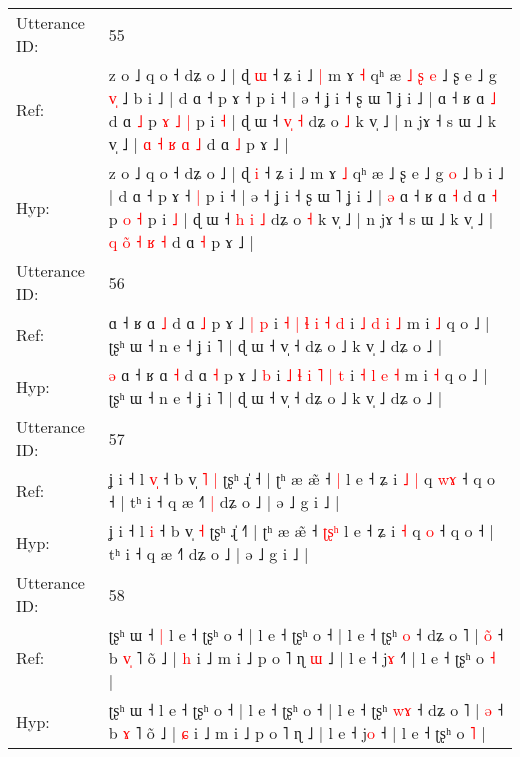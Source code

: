 \documentclass[10pt]{article}
\DeclareRobustCommand{\hl}[1]{{\textcolor{red}{#1}}}
\begin{document}
\begin{longtable}{ll}
 \\
\midrule
Utterance ID: & 55 \\
Ref: & z o ˩ q o ˧ dʑ o ˩ | ɖ \hl{ɯ} ˧ ʑ i ˩\hl{ }\hl{|} m ɤ \hl{˧} qʰ æ\hl{ }\hl{˩}\hl{ }\hl{ʂ}\hl{ }\hl{e} ˩ ʂ e ˩ g \hl{v}\hl{̩} ˩ b i ˩ | d ɑ ˧ p ɤ ˧\hl{}\hl{} p i ˧ | ə ˧ ʝ i ˧ ʂ ɯ ˥ ʝ i ˩ |\hl{}\hl{} ɑ ˧ ʁ ɑ \hl{˩} d ɑ \hl{˩} p\hl{ }\hl{ɤ} \hl{˩} \hl{|} p i \hl{˧} | ɖ ɯ ˧ \hl{}\hl{v}\hl{̩} \hl{˧} dʑ o \hl{˩} k v̩ ˩ | n jɤ ˧ s ɯ ˩ k v̩ ˩ | \hl{ɑ} \hl{}\hl{˧} \hl{ʁ} \hl{ɑ} \hl{˩} d ɑ \hl{˩} p ɤ ˩ |
 \\
Hyp: & z o ˩ q o ˧ dʑ o ˩ | ɖ \hl{i} ˧ ʑ i ˩\hl{}\hl{} m ɤ \hl{˩} qʰ æ\hl{}\hl{}\hl{}\hl{}\hl{}\hl{} ˩ ʂ e ˩ g \hl{}\hl{o} ˩ b i ˩ | d ɑ ˧ p ɤ ˧\hl{ }\hl{|} p i ˧ | ə ˧ ʝ i ˧ ʂ ɯ ˥ ʝ i ˩ |\hl{ }\hl{ə} ɑ ˧ ʁ ɑ \hl{˧} d ɑ \hl{˧} p\hl{}\hl{} \hl{o} \hl{˧} p i \hl{˩} | ɖ ɯ ˧ \hl{h}\hl{ }\hl{i} \hl{˩} dʑ o \hl{˧} k v̩ ˩ | n jɤ ˧ s ɯ ˩ k v̩ ˩ | \hl{q} \hl{o}\hl{̃} \hl{˧} \hl{ʁ} \hl{˧} d ɑ \hl{˧} p ɤ ˩ |
 \\
\midrule
Utterance ID: & 56 \\
Ref: & \hl{}\hl{}ɑ ˧ ʁ ɑ \hl{˩} d ɑ \hl{˩} p ɤ ˩\hl{ }\hl{|} \hl{p} i \hl{˧} \hl{|} \hl{ɬ} \hl{i} \hl{˧} \hl{d} i \hl{˩} \hl{d} \hl{i} \hl{˩} m i \hl{˩} q o ˩ | ʈʂʰ ɯ ˧ n e ˧ ʝ i ˥ | ɖ ɯ ˧ v̩ ˧ dʑ o ˩ k v̩ ˩ dʑ o ˩ |
 \\
Hyp: & \hl{ə}\hl{ }ɑ ˧ ʁ ɑ \hl{˧} d ɑ \hl{˧} p ɤ ˩\hl{}\hl{} \hl{b} i \hl{˩} \hl{ɬ} \hl{i} \hl{˥} \hl{|} \hl{t} i \hl{˧} \hl{l} \hl{e} \hl{˧} m i \hl{˧} q o ˩ | ʈʂʰ ɯ ˧ n e ˧ ʝ i ˥ | ɖ ɯ ˧ v̩ ˧ dʑ o ˩ k v̩ ˩ dʑ o ˩ |
 \\
\midrule
Utterance ID: & 57 \\
Ref: & ʝ i ˧ l \hl{v}\hl{̩} ˧ b v̩\hl{ }\hl{˥} \hl{|} ʈʂʰ ɻ̍ ˧\hl{} | ʈʰ æ æ̃ ˧ \hl{}\hl{}\hl{|} l e ˧ ʑ i\hl{ }\hl{˩} \hl{|} q \hl{w}\hl{ɤ} ˧ q o ˧ | tʰ i ˧ q æ ˧˥\hl{ }\hl{|} dʑ o ˩ | ə ˩ g i ˩ |
 \\
Hyp: & ʝ i ˧ l \hl{}\hl{i} ˧ b v̩\hl{}\hl{} \hl{˧} ʈʂʰ ɻ̍ ˧\hl{˥} | ʈʰ æ æ̃ ˧ \hl{ʈ}\hl{ʂ}\hl{ʰ} l e ˧ ʑ i\hl{}\hl{} \hl{˧} q \hl{}\hl{o} ˧ q o ˧ | tʰ i ˧ q æ ˧˥\hl{}\hl{} dʑ o ˩ | ə ˩ g i ˩ |
 \\
\midrule
Utterance ID: & 58 \\
Ref: & ʈʂʰ ɯ ˧\hl{ }\hl{|} l e ˧ ʈʂʰ o ˧ | l e ˧ ʈʂʰ o ˧ | l e ˧ ʈʂʰ \hl{}\hl{o} ˧ dʑ o ˥ | \hl{o}\hl{̃} ˧ b \hl{v}\hl{̩} ˥ õ ˩ | \hl{h} i ˩ m i ˩ p o ˥ ɳ\hl{ }\hl{ɯ} ˩ | l e ˧ j\hl{ɤ} ˧\hl{˥} | l e ˧ ʈʂʰ o \hl{˧} |
 \\
Hyp: & ʈʂʰ ɯ ˧\hl{}\hl{} l e ˧ ʈʂʰ o ˧ | l e ˧ ʈʂʰ o ˧ | l e ˧ ʈʂʰ \hl{w}\hl{ɤ} ˧ dʑ o ˥ | \hl{}\hl{ə} ˧ b \hl{}\hl{ɤ} ˥ õ ˩ | \hl{ɕ} i ˩ m i ˩ p o ˥ ɳ\hl{}\hl{} ˩ | l e ˧ j\hl{o} ˧\hl{} | l e ˧ ʈʂʰ o \hl{˥} |

\end{longtable}
\end{document}
